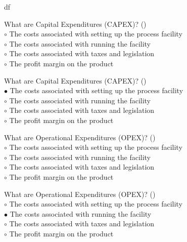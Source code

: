 df\documentclass[]{beamer}
\begin{document}
\begin{CJK}{UTF8}{gbsn}
\begin{frame}[shrink] {}
\addtocounter{questions}{1}
\color{blue}
What are Capital Expenditures (CAPEX)?
({})\\
\color{black}
\setlength{\parindent}{-0.4cm}
{\color{red}$\circ$}  The costs associated with setting up the process facility  \\
{\color{red}$\circ$} The costs associated with running the facility  \\
{\color{red}$\circ$} The costs associated with taxes and legislation  \\
{\color{red}$\circ$} The profit margin on the product  \\
\end{frame}
\begin{frame}[shrink] {}
\addtocounter{answers}{1}
\color{blue}
What are Capital Expenditures (CAPEX)?
({})\\
\color{black}
\setlength{\parindent}{-0.4cm}
{\color{red}$\bullet$} The costs associated with setting up the process facility  \\
{\color{red}$\circ$} The costs associated with running the facility  \\
{\color{red}$\circ$} The costs associated with taxes and legislation  \\
{\color{red}$\circ$} The profit margin on the product  \\
\end{frame}


\begin{frame}[shrink] {}
\addtocounter{questions}{1}
\color{blue}
What are Operational Expenditures (OPEX)?
({})\\
\color{black}
\setlength{\parindent}{-0.4cm}
{\color{red}$\circ$} The costs associated with setting up the process facility  \\
{\color{red}$\circ$}  The costs associated with running the facility  \\
{\color{red}$\circ$} The costs associated with taxes and legislation  \\
{\color{red}$\circ$} The profit margin on the product  \\
\end{frame}
\begin{frame}[shrink] {}
\addtocounter{answers}{1}
\color{blue}
What are Operational Expenditures (OPEX)?
({})\\
\color{black}
\setlength{\parindent}{-0.4cm}
{\color{red}$\circ$} The costs associated with setting up the process facility  \\
{\color{red}$\bullet$} The costs associated with running the facility  \\
{\color{red}$\circ$} The costs associated with taxes and legislation  \\
{\color{red}$\circ$} The profit margin on the product  \\
\end{frame}



\end{CJK}
\end{document}
